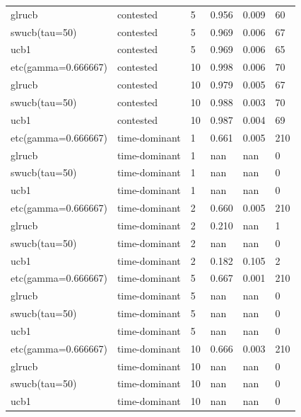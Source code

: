 \begin{tabular}{llllll}
glrucb & contested & 5 & 0.956 & 0.009 & 60 \\
swucb(tau=50) & contested & 5 & 0.969 & 0.006 & 67 \\
ucb1 & contested & 5 & 0.969 & 0.006 & 65 \\
etc(gamma=0.666667) & contested & 10 & 0.998 & 0.006 & 70 \\
glrucb & contested & 10 & 0.979 & 0.005 & 67 \\
swucb(tau=50) & contested & 10 & 0.988 & 0.003 & 70 \\
ucb1 & contested & 10 & 0.987 & 0.004 & 69 \\
etc(gamma=0.666667) & time-dominant & 1 & 0.661 & 0.005 & 210 \\
glrucb & time-dominant & 1 & nan & nan & 0 \\
swucb(tau=50) & time-dominant & 1 & nan & nan & 0 \\
ucb1 & time-dominant & 1 & nan & nan & 0 \\
etc(gamma=0.666667) & time-dominant & 2 & 0.660 & 0.005 & 210 \\
glrucb & time-dominant & 2 & 0.210 & nan & 1 \\
swucb(tau=50) & time-dominant & 2 & nan & nan & 0 \\
ucb1 & time-dominant & 2 & 0.182 & 0.105 & 2 \\
etc(gamma=0.666667) & time-dominant & 5 & 0.667 & 0.001 & 210 \\
glrucb & time-dominant & 5 & nan & nan & 0 \\
swucb(tau=50) & time-dominant & 5 & nan & nan & 0 \\
ucb1 & time-dominant & 5 & nan & nan & 0 \\
etc(gamma=0.666667) & time-dominant & 10 & 0.666 & 0.003 & 210 \\
glrucb & time-dominant & 10 & nan & nan & 0 \\
swucb(tau=50) & time-dominant & 10 & nan & nan & 0 \\
ucb1 & time-dominant & 10 & nan & nan & 0 \\
\bottomrule
\end{tabular}
